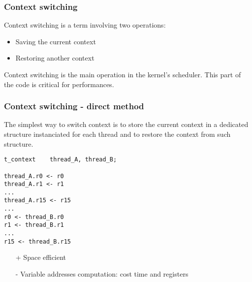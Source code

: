 
\begin{frame}
  \frametitle{Context switching}

  Context switching is a term involving two operations:

  \begin{itemize}
  \item
    Saving the current context
  \item
    Restoring another context
  \end{itemize}

  \-

  Context switching is the main operation in the kernel's
  scheduler. This part of the code is critical for performances.

  \begin{center}
  \end{center}

\end{frame}


\begin{frame}[containsverbatim]
  \frametitle{Context switching - direct method}

  The simplest way to switch context is to store the current context
  in a dedicated structure instanciated for each thread and to restore
  the context from such structure.

  \begin{verbatim}
t_context    thread_A, thread_B;

thread_A.r0 <- r0
thread_A.r1 <- r1
...
thread_A.r15 <- r15
...
r0 <- thread_B.r0
r1 <- thread_B.r1
...
r15 <- thread_B.r15
  \end{verbatim}

  \begin{itemize}
  \item[+]
    Space efficient
  \item[-]
    Variable addresses computation: cost time and registers
  \end{itemize}

\end{frame}


